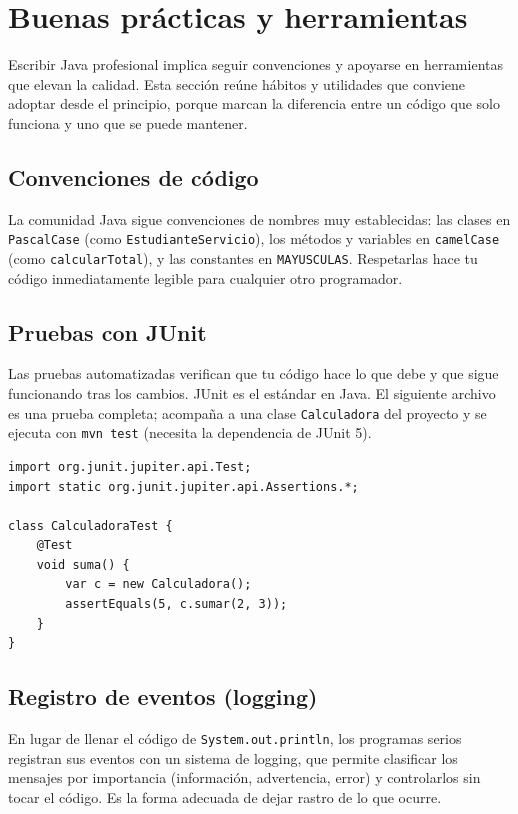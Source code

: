 \documentclass[11pt]{article}
\begin{document}
\section{Buenas prácticas y herramientas}
Escribir Java profesional implica seguir convenciones y apoyarse en herramientas que elevan la calidad. Esta sección reúne hábitos y utilidades que conviene adoptar desde el principio, porque marcan la diferencia entre un código que solo funciona y uno que se puede mantener.

\subsection{Convenciones de código}
La comunidad Java sigue convenciones de nombres muy establecidas: las clases en \texttt{Pascal\allowbreak{}Case} (como \texttt{Estudiante\allowbreak{}Servicio}), los métodos y variables en \texttt{camel\allowbreak{}Case} (como \texttt{calcular\allowbreak{}Total}), y las constantes en \texttt{MAYUSCULAS}. Respetarlas hace tu código inmediatamente legible para cualquier otro programador.

\subsection{Pruebas con JUnit}
Las pruebas automatizadas verifican que tu código hace lo que debe y que sigue funcionando tras los cambios. JUnit es el estándar en Java. El siguiente archivo es una prueba completa; acompaña a una clase \texttt{Calculadora} del proyecto y se ejecuta con \texttt{mvn test} (necesita la dependencia de JUnit 5).

\begin{cajacodigo}
\begin{lstlisting}[style=java]
import org.junit.jupiter.api.Test;
import static org.junit.jupiter.api.Assertions.*;

class CalculadoraTest {
    @Test
    void suma() {
        var c = new Calculadora();
        assertEquals(5, c.sumar(2, 3));
    }
}
\end{lstlisting}
\end{cajacodigo}
\vspace{2pt}
\subsection{Registro de eventos (logging)}
En lugar de llenar el código de \texttt{System.\allowbreak{}out.\allowbreak{}println}, los programas serios registran sus eventos con un sistema de logging, que permite clasificar los mensajes por importancia (información, advertencia, error) y controlarlos sin tocar el código. Es la forma adecuada de dejar rastro de lo que ocurre.
\end{document}
